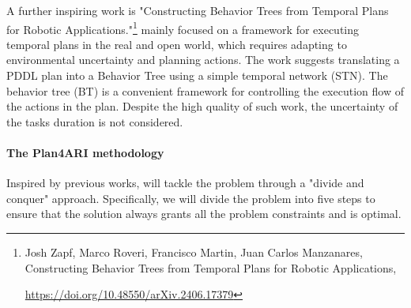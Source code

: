 A further inspiring work is "Constructing Behavior Trees from Temporal
Plans for Robotic Applications."\footnote{Josh Zapf, Marco Roveri,
  Francisco Martin, Juan Carlos Manzanares, Constructing Behavior Trees
  from Temporal Plans for Robotic Applications,

  \url{https://doi.org/10.48550/arXiv.2406.17379}} mainly focused on a
framework for executing temporal plans in the real and open world, which
requires adapting to environmental uncertainty and planning actions. The
work suggests translating a PDDL plan into a Behavior Tree using a
simple temporal network (STN). The behavior tree (BT) is a convenient
framework for controlling the execution flow of the actions in the plan.
Despite the high quality of such work, the uncertainty of the
task\textquotesingle s duration is not considered.

\paragraph{The Plan4ARI methodology}\label{the-plan4ari-methodology}

Inspired by previous works,  will tackle the problem
through a "divide and conquer" approach. Specifically, we will divide
the problem into five steps to ensure that the solution always grants
all the problem constraints and is optimal.

